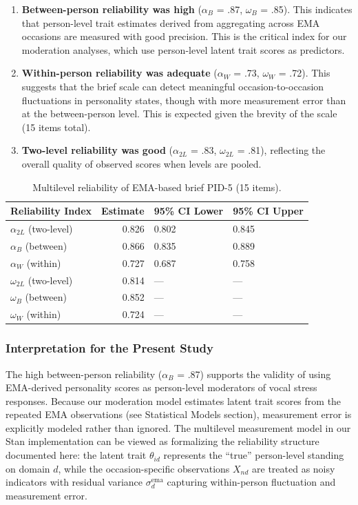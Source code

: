 \documentclass[
  english,
  man,floatsintext]{apa6}
\begin{document}
\begin{enumerate}
\def\labelenumi{\arabic{enumi}.}
\item
  \textbf{Between-person reliability was high} (\(\alpha_B\) = .87, \(\omega_B\) = .85). This indicates that person-level trait estimates derived from aggregating across EMA occasions are measured with good precision. This is the critical index for our moderation analyses, which use person-level latent trait scores as predictors.
\item
  \textbf{Within-person reliability was adequate} (\(\alpha_W\) = .73, \(\omega_W\) = .72). This suggests that the brief scale can detect meaningful occasion-to-occasion fluctuations in personality states, though with more measurement error than at the between-person level. This is expected given the brevity of the scale (15 items total).
\item
  \textbf{Two-level reliability was good} (\(\alpha_{2L}\) = .83, \(\omega_{2L}\) = .81), reflecting the overall quality of observed scores when levels are pooled.
\end{enumerate}

\begin{table}

\caption{\label{tab:table-s2-ema-reliability}Multilevel reliability of EMA-based brief PID-5 (15 items).}
\centering
\begin{tabular}[t]{lrll}
\toprule
Reliability Index & Estimate & 95\% CI Lower & 95\% CI Upper\\
\midrule
$\alpha_{2L}$ (two-level) & 0.826 & 0.802 & 0.845\\
$\alpha_B$ (between) & 0.866 & 0.835 & 0.889\\
$\alpha_W$ (within) & 0.727 & 0.687 & 0.758\\
$\omega_{2L}$ (two-level) & 0.814 & --- & ---\\
$\omega_B$ (between) & 0.852 & --- & ---\\
\addlinespace
$\omega_W$ (within) & 0.724 & --- & ---\\
\bottomrule
\end{tabular}
\end{table}

\subsubsection{Interpretation for the Present Study}\label{interpretation-for-the-present-study}

The high between-person reliability (\(\alpha_B\) = .87) supports the validity of using EMA-derived personality scores as person-level moderators of vocal stress responses. Because our moderation model estimates latent trait scores from the repeated EMA observations (see Statistical Models section), measurement error is explicitly modeled rather than ignored. The multilevel measurement model in our Stan implementation can be viewed as formalizing the reliability structure documented here: the latent trait \(\theta_{id}\) represents the ``true'' person-level standing on domain \(d\), while the occasion-specific observations \(X_{nd}\) are treated as noisy indicators with residual variance \(\sigma_d^{\text{ema}}\) capturing within-person fluctuation and measurement error.
\end{document}
